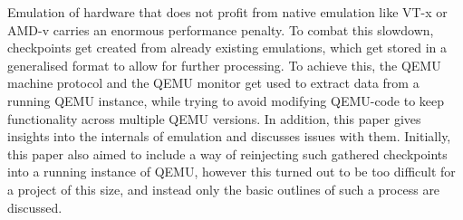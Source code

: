 
\Abstract
Emulation of hardware that does not profit from native emulation like VT-x or AMD-v carries an enormous performance penalty.
To combat this slowdown, checkpoints get created from already existing emulations,
which get stored in a generalised format to allow for further processing.
To achieve this, the QEMU  machine protocol and the QEMU monitor get used to extract data from a running QEMU instance,
while trying to avoid modifying QEMU-code to keep functionality across multiple QEMU versions.
In addition, this paper gives insights into the internals of emulation and discusses issues with them.
Initially, this paper also aimed to include a way of reinjecting such gathered checkpoints into a running instance of QEMU,
however this turned out to be too difficult for a project of this size,
and instead only the basic outlines of such a process are discussed.
